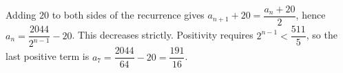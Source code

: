 Adding $20$ to both sides of the recurrence gives $a_{n+1}+20=\dfrac{a_n+20}{2}$, hence $a_n=\dfrac{2044}{2^{n-1}}-20$. This decreases strictly. Positivity requires $2^{n-1}<\dfrac{511}{5}$, so the last positive term is $a_7=\dfrac{2044}{64}-20=\boxed{\dfrac{191}{16}}$.
